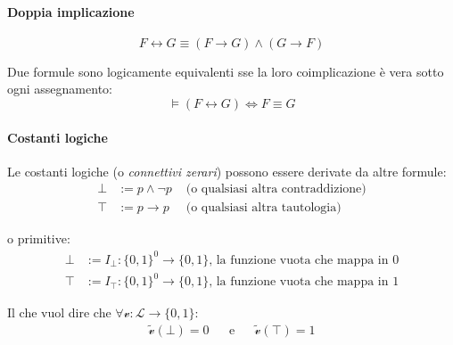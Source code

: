 \paragraph{Doppia implicazione}
$$
F \leftrightarrow  G \equiv (F \rightarrow G) \land (G \rightarrow F)
$$

Due formule sono logicamente equivalenti sse la loro coimplicazione è vera sotto ogni assegnamento:
$$
\models (F \leftrightarrow G) \iff F \equiv G
$$

\paragraph{Costanti logiche}
Le costanti logiche (o \textit{connettivi zerari}) possono essere derivate da altre formule:
\begin{align*}
  \bot & := p \land \neg p & \text{ (o qualsiasi altra contraddizione)} \\
  \top & := p \rightarrow p & \text{ (o qualsiasi altra tautologia)}
\end{align*}

o primitive:
\begin{align*}
  \bot & :=  I_{\bot} : \{0,1\}^0 \rightarrow \{0,1\} \text{, la funzione vuota che mappa in } 0 \\
  \top & :=  I_{\top} : \{0,1\}^0 \rightarrow \{0,1\} \text{, la funzione vuota che mappa in } 1
\end{align*}

Il che vuol dire che $\forall \mathcal{v} : \mathscr{L} \rightarrow \{0,1\}$:
\begin{align*}
  \widetilde{\mathcal{v}}(\bot) = 0 &&
  \text{e}&&
  \widetilde{\mathcal{v}}(\top) = 1
\end{align*}
 

